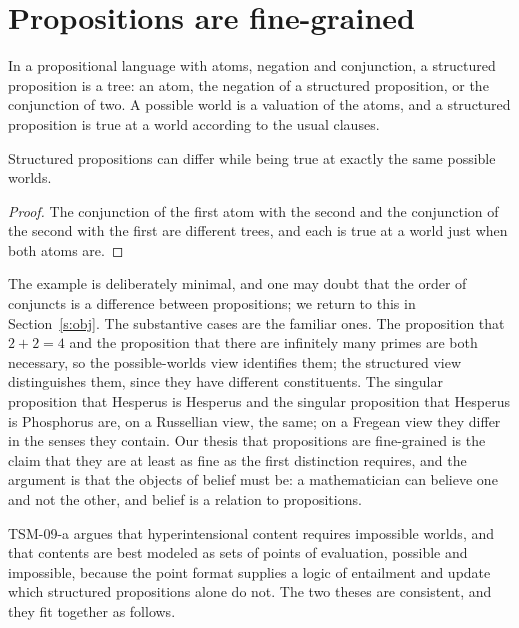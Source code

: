 \documentclass{situationist-preprint}
\begin{document}
\section{Propositions are fine-grained}\label{s:fine}

\begin{definition}\label{d:sprop}
In a propositional language with atoms, negation and conjunction, a structured proposition is a tree: an atom, the negation of a structured proposition, or the conjunction of two. A possible world is a valuation of the atoms, and a structured proposition is true at a world according to the usual clauses.
\end{definition}

\begin{proposition}\label{p:finer}
Structured propositions can differ while being true at exactly the same possible worlds.
\end{proposition}

\begin{proof}
The conjunction of the first atom with the second and the conjunction of the second with the first are different trees, and each is true at a world just when both atoms are.
\end{proof}

The example is deliberately minimal, and one may doubt that the order of conjuncts is a difference between propositions; we return to this in Section~\ref{s:obj}. The substantive cases are the familiar ones. The proposition that $2+2=4$ and the proposition that there are infinitely many primes are both necessary, so the possible-worlds view identifies them; the structured view distinguishes them, since they have different constituents. The singular proposition that Hesperus is Hesperus and the singular proposition that Hesperus is Phosphorus are, on a Russellian view, the same; on a Fregean view they differ in the senses they contain. Our thesis that propositions are fine-grained is the claim that they are at least as fine as the first distinction requires, and the argument is that the objects of belief must be: a mathematician can believe one and not the other, and belief is a relation to propositions.

TSM-09-a argues that hyperintensional content requires impossible worlds, and that contents are best modeled as sets of points of evaluation, possible and impossible, because the point format supplies a logic of entailment and update which structured propositions alone do not. The two theses are consistent, and they fit together as follows.
\end{document}
